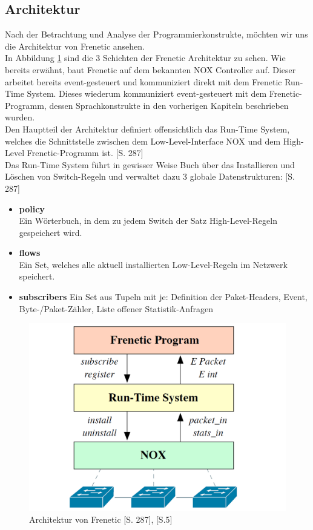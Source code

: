 \documentclass[10pt,conference]{IEEEtran}
\begin{document}
\subsection{Architektur}
Nach der Betrachtung und Analyse der Programmierkonstrukte, möchten wir uns die Architektur von Frenetic ansehen.\\
In Abbildung \ref{fig:freneticArchitecture} sind die 3 Schichten der Frenetic Architektur zu sehen. Wie bereits erwähnt, baut Frenetic auf dem bekannten NOX Controller auf. Dieser arbeitet bereits event-gesteuert und kommuniziert direkt mit dem Frenetic Run-Time System. Dieses wiederum kommuniziert event-gesteuert mit dem Frenetic-Programm, dessen Sprachkonstrukte in den vorherigen Kapiteln beschrieben wurden.\\
\newline
Den Hauptteil der Architektur definiert offensichtlich das Run-Time System, welches die Schnittstelle zwischen dem Low-Level-Interface NOX und dem High-Level Frenetic-Programm ist. \cite{4}[S. 287]\\
Das Run-Time System führt in gewisser Weise Buch über das Installieren und Löschen von Switch-Regeln und verwaltet dazu 3 globale Datenstrukturen: \cite{4}[S. 287]
\begin{itemize}
	\item \textbf{policy}\\
	Ein Wörterbuch, in dem zu jedem Switch der Satz High-Level-Regeln gespeichert wird.
	\item \textbf{flows}\\
	Ein Set, welches alle aktuell installierten Low-Level-Regeln im Netzwerk speichert.
	\item \textbf{subscribers}
	Ein Set aus Tupeln mit je: Definition der Paket-Headers, Event, Byte-/Paket-Zähler, Liste offener Statistik-Anfragen
\end{itemize}
\begin{figure}[h]
	\centering
	\includegraphics[width=\columnwidth]{images/freneticArchitecture.PNG}
	\caption{Architektur von Frenetic \cite{4}[S. 287], \cite{3}[S.5]}
	\label{fig:freneticArchitecture}
\end{figure}
\end{document}
